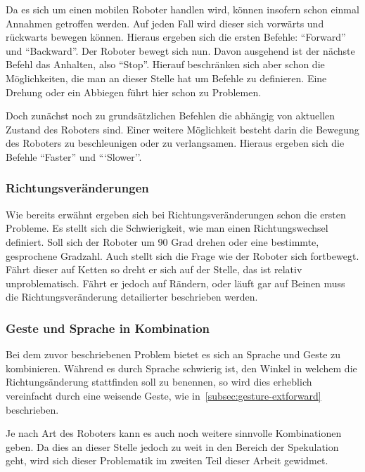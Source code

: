 Da es sich um einen mobilen Roboter handlen wird, k\"onnen insofern schon einmal Annahmen getroffen werden. Auf jeden Fall wird dieser sich vorw\"arts 
und r\"uckwarts bewegen k\"onnen. Hieraus ergeben sich die ersten Befehle: ``Forward'' und ``Backward''. Der Roboter bewegt sich nun. Davon ausgehend 
ist der n\"achste Befehl das Anhalten, also ``Stop''. Hierauf beschr\"anken sich aber schon die M\"oglichkeiten, die man an dieser Stelle hat um 
Befehle zu definieren. Eine Drehung oder ein Abbiegen f\"uhrt hier schon zu Problemen. 

Doch zun\"achst noch zu grunds\"atzlichen Befehlen die abh\"angig von aktuellen Zustand des Roboters sind. Einer weitere M\"oglichkeit besteht 
darin die Bewegung des Roboters zu beschleunigen oder zu verlangsamen. Hieraus ergeben sich die Befehle ``Faster'' und ```Slower''.


\subsubsection{Richtungsver\"anderungen}

Wie bereits erw\"ahnt ergeben sich bei Richtungsver\"anderungen schon die ersten Probleme. Es stellt sich die Schwierigkeit, wie man einen 
Richtungswechsel definiert. Soll sich der Roboter um 90 Grad drehen oder eine bestimmte, gesprochene Gradzahl. Auch stellt sich die Frage wie 
der Roboter sich fortbewegt. F\"ahrt dieser auf Ketten so dreht er sich auf der Stelle, das ist relativ unproblematisch. F\"ahrt er jedoch 
auf R\"andern, oder l\"auft gar auf Beinen muss die Richtungsver\"anderung detailierter beschrieben werden. 

\subsubsection{Geste und Sprache in Kombination}

Bei dem zuvor beschriebenen Problem bietet es sich an Sprache und Geste zu kombinieren. W\"ahrend es durch Sprache schwierig ist, den Winkel in 
welchem die Richtungs\"anderung stattfinden soll zu benennen, so wird dies erheblich vereinfacht durch eine weisende Geste, wie in~\ref{subsec:gesture-extforward} beschrieben.

Je nach Art des Roboters kann es auch noch weitere sinnvolle Kombinationen geben. Da dies an dieser Stelle jedoch zu weit in den Bereich der Spekulation geht,
wird sich dieser Problematik im zweiten Teil dieser Arbeit gewidmet.





